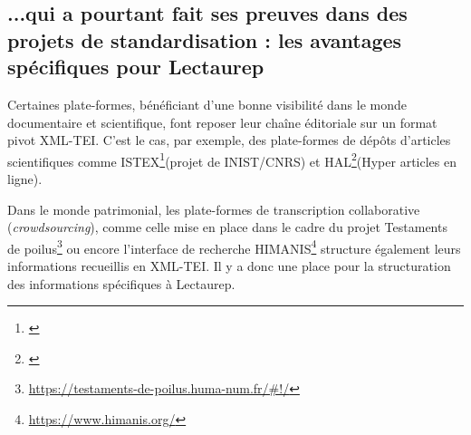 \subsection{...qui a pourtant fait ses preuves dans des projets de standardisation : les avantages spécifiques pour Lectaurep}\label{positif_TEI}

Certaines plate-formes, bénéficiant d'une bonne visibilité dans le monde documentaire et scientifique, font reposer leur chaîne éditoriale sur un format pivot XML-TEI. C'est le cas, par exemple, des plate-formes de dépôts d'articles scientifiques comme ISTEX\footnote{\cite{inistcnrs_istex_2020}}(projet de INIST/CNRS) et HAL\footnote{\cite{capelli_tei_2015}}(Hyper articles en ligne). 

Dans le monde patrimonial, les plate-formes de transcription collaborative (\textit{crowdsourcing}), comme celle mise en place dans le cadre du projet Testaments de poilus\footnote{\url{https://testaments-de-poilus.huma-num.fr/\#!/}} ou encore l'interface de recherche HIMANIS\footnote{\url{https://www.himanis.org/}} structure également leurs informations recueillis en XML-TEI. Il y a donc une place pour la structuration des informations spécifiques à Lectaurep.\\

